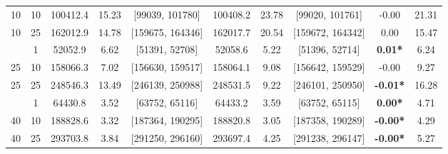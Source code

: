 \begin{table}
\begin{tabular}[t]{cccccccccc}
10 & 10 & 100412.4 & 15.23 & {}[99039, 101780] & 100408.2 & 23.78 & {}[99020, 101761] & -0.00 & 21.31\\
10 & 25 & 162012.9 & 14.78 & {}[159675, 164346] & 162017.7 & 20.54 & {}[159672, 164342] & 0.00 & 15.47\\
\addlinespace
25 & 1 & 52052.9 & 6.62 & {}[51391, 52708] & 52058.6 & 5.22 & {}[51396, 52714] & \textbf{0.01*} & 6.24\\
25 & 10 & 158066.3 & 7.02 & {}[156630, 159517] & 158064.1 & 9.08 & {}[156642, 159529] & -0.00 & 9.27\\
25 & 25 & 248546.3 & 13.49 & {}[246139, 250988] & 248531.5 & 9.22 & {}[246101, 250950] & \textbf{-0.01*} & 16.28\\
\addlinespace
40 & 1 & 64430.8 & 3.52 & {}[63752, 65116] & 64433.2 & 3.59 & {}[63752, 65115] & \textbf{0.00*} & 4.71\\
40 & 10 & 188828.6 & 3.32 & {}[187364, 190295] & 188820.8 & 3.05 & {}[187358, 190289] & \textbf{-0.00*} & 4.29\\
40 & 25 & 293703.8 & 3.84 & {}[291250, 296160] & 293697.4 & 4.25 & {}[291238, 296147] & \textbf{-0.00*} & 5.27\\
\bottomrule
\end{tabular}
\end{table}

